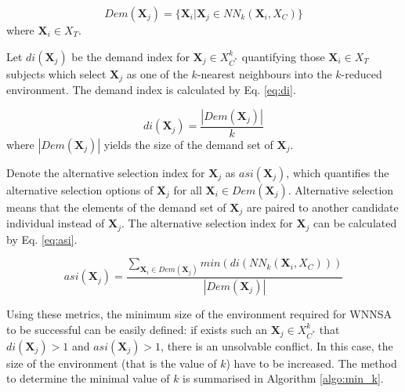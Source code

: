 		\begin{equation}
			Dem(\textbf{X}_j)=\{\textbf{X}_i | \textbf{X}_j \in  NN_k(\textbf{X}_i,X_C) \}
			\label{eq:demandset}
		\end{equation}
		where $\textbf{X}_i \in X_T $.
								
		Let $di(\textbf{X}_j)$ be the demand index for $\textbf{X}_j \in X_{C^*}^{k}$ quantifying those $\textbf{X}_i \in X_T$ subjects which select $\textbf{X}_j$ as one of the $k$-nearest neighbours into the $k$-reduced environment. The demand index is calculated by Eq. \ref{eq:di}.
								
		\begin{equation}
			di(\textbf{X}_j) = \frac{|Dem(\textbf{X}_j)|}{k}
			\label{eq:di}
		\end{equation}
		where $|Dem(\textbf{X}_j)|$ yields the size of the demand set of $\textbf{X}_j$.
								
		Denote the alternative selection index for $\textbf{X}_j$ as $asi(\textbf{X}_j)$, which quantifies the alternative selection options of $\textbf{X}_j$ for all $\textbf{X}_i \in Dem(\textbf{X}_j)$. Alternative selection means that the elements of the demand set of $\textbf{X}_j$ are paired to another candidate individual instead of $\textbf{X}_j$. The alternative selection index for $\textbf{X}_j$ can be calculated by Eq. \ref{eq:asi}.
								
		\begin{equation}
			asi(\textbf{X}_j) = \frac{\sum_{\textbf{X}_i \in Dem(\textbf{X}_j)} min (di(NN_k(\textbf{X}_i, X_C))) }{|Dem(\textbf{X}_j)|}
			\label{eq:asi}
		\end{equation}
								
		Using these metrics, the minimum size of the environment required for WNNSA to be successful can be easily defined: if exists such an $ \textbf{X}_j \in X_{C^*}^k$ that $di(\textbf{X}_j)>1$ and $asi(\textbf{X}_j)>1$, there is an unsolvable conflict. In this case, the size of the environment (that is the value of $k$) have to be increased. The method to determine the minimal value of $k$ is summarised in Algorithm \ref{algo:min_k}.
								
